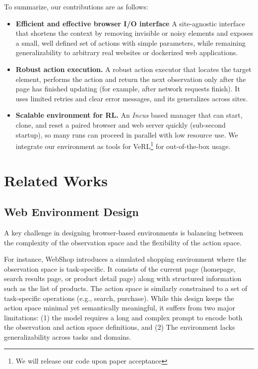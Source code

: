 \documentclass{article}
\DeclareRobustCommand{\todo}[1]{{\sethlcolor{blue!30!white}\hl{#1}}}
\begin{document}
To summarize, our contributions are as follows:
\begin{itemize}[leftmargin=*]
\item \textbf{Efficient and effective browser I/O interface} A site-agnostic interface that shortens the context by removing invisible or noisy elements and exposes a small, well defined set of actions with simple parameters, while remaining generalizability to arbitrary real websites or dockerized web applications.
\item \textbf{Robust action execution.} A robust action executor that locates the target element, performs the action and return the next observation only after the page has finished updating (for example, after network requests finish). It uses limited retries and clear error messages, and its generalizes across sites.
\item \textbf{Scalable environment for RL.} An \textit{Incus} based manager that can start, clone, and reset a paired browser and web server quickly (sub-second startup), so many runs can proceed in parallel with low resource use. We integrate our environment as tools for VeRL\footnote{We will release our code upon paper acceptance} for out-of-the-box usage.
\end{itemize}


\section{Related Works}


\subsection{Web Environment Design}
A key challenge in designing browser-based environments is balancing between the complexity of the observation space and the flexibility of the action space. 

For instance, WebShop \cite{yaoWebShopScalableRealWorld2022} introduces a simulated shopping environment where the observation space is task-specific. It consists of the current page (homepage, search results page, or product detail page) along with structured information such as the list of products. 
The action space is similarly constrained to a set of task-specific operations (e.g., search, purchase). 
While this design keeps the action space minimal yet semantically meaningful, it suffers from two major limitations: 
(1) the model requires a long and complex prompt to encode both the observation and action space definitions, and 
(2) The environment lacks generalizability across tasks and domains.
\end{document}
